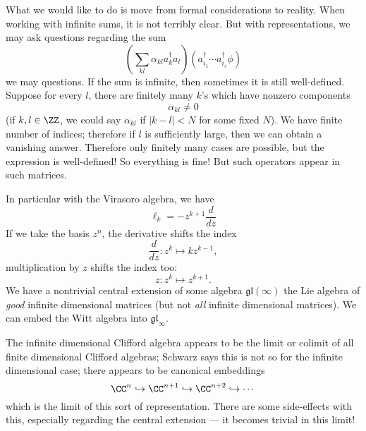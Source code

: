What we would like to do is move from formal considerations to
reality. When working with infinite sums, it is not terribly
clear. But with representations, we may ask questions regarding
the sum
\begin{equation}
\left(\sum_{kl}\alpha_{kl}a^{\dagger}_{k}a_{l}\right)(a^{\dagger}_{i_{1}}\cdots
a^{\dagger}_{i_{s}}\phi)
\end{equation}
we may questions. If the sum is infinite, then sometimes it is
still well-defined. Suppose for every $l$, there are finitely
many $k$'s which have nonzero components
\begin{equation}
\alpha_{kl}\not=0
\end{equation}
(if $k,l\in\ZZ$, we could say $\alpha_{kl}$ if $|k-l|<N$ for some
fixed $N$). We have finite number of indices; therefore if $l$ is
sufficiently large, then we can obtain a vanishing
answer. Therefore only finitely many cases are possible, but the
expression is well-defined! So everything is fine! But such
operators appear in such matrices.

In particular with the Virasoro algebra, we have
\begin{equation}
\ell_{k} = -z^{k+1}\frac{d}{dz}
\end{equation}
If we take the basis $z^{n}$, the derivative shifts the index
\begin{equation}
\frac{d}{dz}\colon z^{k}\mapsto kz^{k-1},
\end{equation}
multiplication by $z$ shifts the index too:
\begin{equation}
z\colon z^{k}\mapsto z^{k+1}.
\end{equation}
We have a nontrivial central extension of some algebra
$\mathfrak{gl}(\infty)$ the Lie algebra of \emph{good} infinite
dimensional matrices (but not \emph{all} infinite dimensional
matrices). We can embed the Witt algebra into $\mathfrak{gl}_{\infty}$.

\begin{rmk}
The infinite dimensional Clifford algebra appears to be the limit
or colimit of all finite dimensional Clifford algebras; Schwarz
says this is not so for the infinite dimensional case; there
appears to be canonical embeddings
\begin{equation}
\CC^{n}\hookrightarrow\CC^{n+1}\hookrightarrow\CC^{n+2}\hookrightarrow\cdots
\end{equation}
which is the limit of this sort of representation. There are some
side-effects with this, especially regarding the central
extension --- it becomes trivial in this limit!
\end{rmk}


